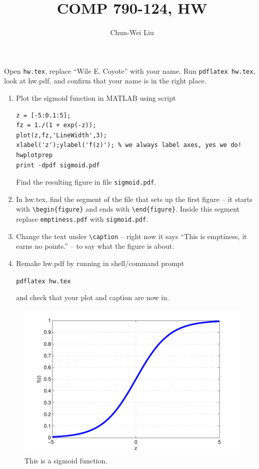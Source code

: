 \documentclass{article}
\begin{document}
\author{Chun-Wei Liu}
\title{COMP  790-124, HW\theHW}
\maketitle



\newproblem{0.01pt} Open \texttt{hw\theHW.tex}, replace ``Wile E. Coyote'' with your name. Run
\texttt{pdflatex hw\theHW.tex}, look at hw\theHW.pdf, and confirm that your name is in the right place.


\newproblem{1pt}
\begin{enumerate}
\item Plot the sigmoid function in MATLAB using script
\begin{verbatim}
z = [-5:0.1:5];
fz = 1./(1 + exp(-z));
plot(z,fz,'LineWidth',3);
xlabel('z');ylabel('f(z)'); % we always label axes, yes we do!
hwplotprep
print -dpdf sigmoid.pdf
\end{verbatim}
Find the resulting figure in file {\tt sigmoid.pdf}.
\item In hw\theHW.tex, find the segment of the file that sets up the first figure -- it starts with {\tt \textbackslash begin\{figure\}} and ends with  {\tt \textbackslash end\{figure\}}. Inside this segment  replace {\tt emptiness.pdf} with {\tt sigmoid.pdf}.
\item Change the text under {\tt \textbackslash caption} -- right now it says ``This is emptiness, it earns no points.'' -- to say what the figure is about.
\item Remake hw\theHW.pdf by running in shell/command prompt

     \texttt{pdflatex hw\theHW.tex}

and check that your plot and caption are now in.
\end{enumerate}


\begin{figure}[H]
\begin{center}
\includegraphics[scale=0.5]{sigmoid.pdf}
\caption{This is a sigmoid function.}
\end{center}
\end{figure}
\end{document}
